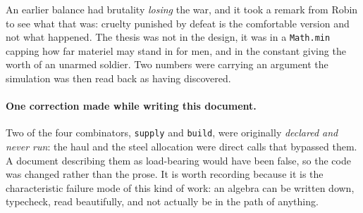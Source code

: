 \documentclass[11pt,a4paper]{article}
\begin{document}
An earlier balance had brutality \emph{losing} the war, and it took a remark
from Robin to see what that was: cruelty punished by defeat is the comfortable
version and not what happened. The thesis was not in the design, it was in a
\verb|Math.min| capping how far materiel may stand in for men, and in the
constant giving the worth of an unarmed soldier. Two numbers were carrying an
argument the simulation was then read back as having discovered.

\paragraph{One correction made while writing this document.} Two of the four
combinators, \verb|supply| and \verb|build|, were originally \emph{declared and
never run}: the haul and the steel allocation were direct calls that bypassed
them. A document describing them as load-bearing would have been false, so the
code was changed rather than the prose. It is worth recording because it is the
characteristic failure mode of this kind of work: an algebra can be written
down, typecheck, read beautifully, and not actually be in the path of anything.
\end{document}
